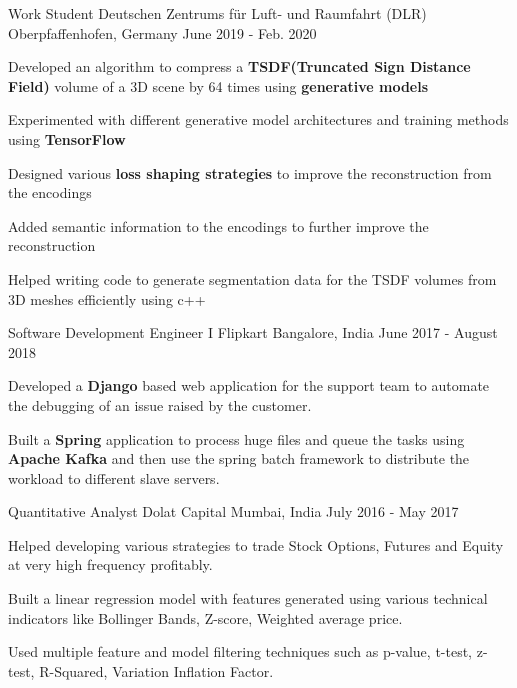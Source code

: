 
\begin{cventries}
  \cventry
    {Work Student} %
    {Deutschen Zentrums für Luft- und Raumfahrt (DLR)} %
    {Oberpfaffenhofen, Germany} %
    {June 2019 - Feb. 2020} %
    {
      \begin{cvitems} %
        \item {Developed an algorithm to compress a \textbf{TSDF(Truncated Sign Distance Field)} volume of a 3D scene by 64 times using \textbf{generative models}}
        \item {Experimented with different generative model architectures and training methods using \textbf{TensorFlow}}
        \item {Designed various \textbf{loss shaping strategies} to improve the reconstruction from the encodings}
        \item {Added semantic information to the encodings to further improve the reconstruction}
        \item {Helped writing code to generate segmentation data for the TSDF volumes from 3D meshes efficiently using c++}
      \end{cvitems}
    }

  \cventry
    {Software Development Engineer I} %
    {Flipkart} %
    {Bangalore, India} %
    {June 2017 - August 2018} %
    {
      \begin{cvitems} %
        \item {Developed a \textbf{Django} based web application for the support team to automate the debugging of an issue raised by the customer.}
        \item {Built a \textbf{Spring} application to process huge files and queue the tasks using \textbf{Apache Kafka} and then use the spring batch framework to distribute the workload to different slave servers.}
      \end{cvitems}
    }

  \cventry
    {Quantitative Analyst} %
    {Dolat Capital} %
    {Mumbai, India} %
    {July 2016 - May 2017} %
    {
      \begin{cvitems} %
        \item {Helped developing various strategies to trade Stock Options, Futures and Equity at very high frequency profitably.}
        \item {Built a linear regression model with features generated using various technical indicators like Bollinger Bands, Z-score, Weighted average price.}
        \item {Used multiple feature and model filtering techniques such as p-value, t-test, z-test, R-Squared, Variation Inflation Factor.}
      \end{cvitems}
    }


\end{cventries}
